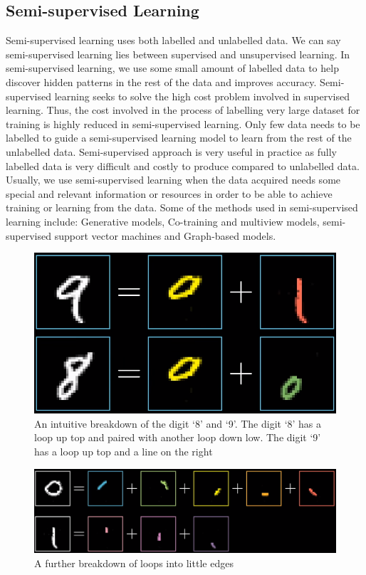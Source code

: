 \documentclass[master]{thesis-uestc}
\begin{document}
\subsection{Semi-supervised Learning}
Semi-supervised learning uses both labelled and unlabelled data. We can say semi-supervised learning lies between supervised and unsupervised learning. In semi-supervised learning, we use some small amount of labelled data to help discover hidden patterns in the rest of the data and improves accuracy. Semi-supervised learning seeks to solve the high cost problem involved in supervised learning. Thus, the cost involved in the process of labelling very large dataset for training is highly reduced in semi-supervised learning. Only few data needs to be labelled to guide a semi-supervised learning model to learn from the rest of the unlabelled data. Semi-supervised approach is very useful in practice as fully labelled data is very difficult and costly to produce compared to unlabelled data. Usually, we use semi-supervised learning when the data acquired needs some special and relevant information or resources in order to be able to achieve training or learning from the data. Some of the methods used in semi-supervised learning include: Generative models, Co-training and multiview models, semi-supervised support vector machines and Graph-based models.

\begin{figure}[ht]
\includegraphics[width=5in]{pic/digits.PNG}
\caption{An intuitive breakdown of the digit `8' and `9'. The digit `8' has a loop up top and paired with another loop down low. The digit `9' has a loop up top and a line on the right}
\label{fig_digit}
\end{figure}
\begin{figure}[ht]
\includegraphics[width=5in]{pic/digits_subcomponents.PNG}
\caption{A further breakdown of loops into little edges}
\label{fig_digit_sub}
\end{figure}
\end{document}
